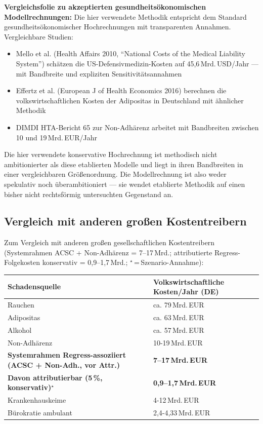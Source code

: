 \documentclass{umbruch-position}
\begin{document}
\textbf{Vergleichsfolie zu akzeptierten gesundheitsökonomischen Modellrechnungen:} Die hier verwendete Methodik entspricht dem Standard gesundheitsökonomischer Hochrechnungen mit transparenten Annahmen. Vergleichbare Studien:
\begin{itemize}[nosep]
  \item Mello et al. (Health Affairs 2010, ``National Costs of the Medical Liability System'') schätzen die US-Defensivmedizin-Kosten auf 45,6\,Mrd.\,USD/Jahr — mit Bandbreite und expliziten Sensitivitätsannahmen
  \item Effertz et al. (European J of Health Economics 2016) berechnen die volkswirtschaftlichen Kosten der Adipositas in Deutschland mit ähnlicher Methodik
  \item DIMDI HTA-Bericht 65 zur Non-Adhärenz arbeitet mit Bandbreiten zwischen 10 und 19\,Mrd.\,EUR/Jahr
\end{itemize}
Die hier verwendete konservative Hochrechnung ist methodisch nicht ambitionierter als diese etablierten Modelle und liegt in ihren Bandbreiten in einer vergleichbaren Größenordnung. Die Modellrechnung ist also weder spekulativ noch überambitioniert — sie wendet etablierte Methodik auf einen bisher nicht rechtsförmig untersuchten Gegenstand an.

\subsection{Vergleich mit anderen großen Kostentreibern}

Zum Vergleich mit anderen großen gesellschaftlichen Kostentreibern (Systemrahmen ACSC + Non-Adhärenz = 7--17\,Mrd.; attributierte Regress-Folgekosten konservativ = 0,9--1,7\,Mrd.; $^\star$\,=\,Szenario-Annahme):

{\small
\begin{tabularx}{\textwidth}{X X}
\toprule
\textbf{Schadensquelle} & \textbf{Volkswirtschaftliche Kosten/Jahr (DE)} \\
\midrule
Rauchen & ca. 79\,Mrd.\,EUR \\
Adipositas & ca. 63\,Mrd.\,EUR \\
Alkohol & ca. 57\,Mrd.\,EUR \\
Non-Adhärenz & 10-19\,Mrd.\,EUR \\
\textbf{Systemrahmen Regress-assoziiert (ACSC + Non-Adh., vor Attr.)} & \textbf{7--17\,Mrd.\,EUR} \\
\textbf{Davon attributierbar (5\,\%, konservativ)}$^\star$ & \textbf{0,9--1,7\,Mrd.\,EUR} \\
Krankenhauskeime & 4-12\,Mrd.\,EUR \\
Bürokratie ambulant & 2,4-4,33\,Mrd.\,EUR \\
\bottomrule
\end{tabularx}
}
\end{document}
